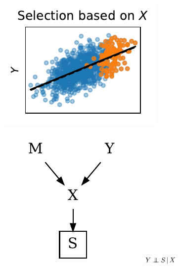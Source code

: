 \documentclass[twocolumn]{article}
\newcommand\indep{\protect\mathpalette{\protect\independenT}{\perp}}
\def\independenT#1#2{\mathrel{\rlap{$#1#2$}\mkern3.5mu{#1#2}}}
\begin{document}
\begin{figure}
\begin{minipage}{.3\textwidth}
  \begin{minipage}{\textwidth}
\vspace{-7pt}
  \begin{minipage}{.57\textwidth}
    \includegraphics[width=\textwidth]{selection_bias_3.pdf}
  \end{minipage}%
  \begin{minipage}{.42\textwidth}
    \includegraphics[width=\textwidth]{sample_selection_bias_3.pdf}
    \centering
    \(Y \indep S \, | \, X\)
  \end{minipage}


\end{minipage}
\end{minipage}
\end{figure}
\end{document}
